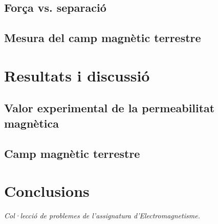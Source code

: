 \documentclass[a4paper,10.5pt]{report}
\begin{document}
\subsection{Força vs. separació}
\subsection{Mesura del camp magnètic terrestre}

\section{Resultats i discussió}

\subsection{Valor experimental de la permeabilitat magnètica}
\subsection{Camp magnètic terrestre}

\section{Conclusions}

\begin{thebibliography}{99}
	\textit{Col·lecció de problemes de l'assignatura d'Electromagnetisme.}
\end{thebibliography}
\end{document}

